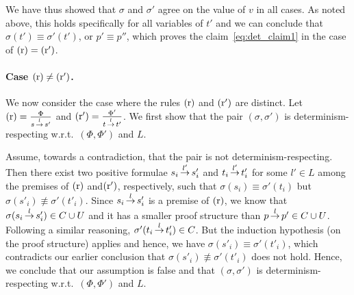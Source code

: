 We have thus showed that $\sigma$ and $\sigma'$ agree on the value of $v$ in all cases. 
As noted above, this holds specifically for all variables of $t'$
and we can conclude that $\sigma(t')\equiv\sigma'(t')$, or $p'\equiv p''$, 
which proves the claim~\eqref{eq:det_claim1} in the case of $\mathrm{(r)}=\mathrm{(r')}$.

\paragraph{Case $\mathrm{(r)}\ne\mathrm{(r')}$.}
We now consider the case where the rules $\mathrm{(r)}$ and $\mathrm{(r')}$ are distinct.
Let $\mathrm{(r)} = \frac{\Phi}{s\,{\stackrel{{l}}{\rightarrow}}\,s'}$ and $\mathrm{(r')}=\frac{\Phi'}{t\,{\stackrel{{l}}{\rightarrow}}\,t'}$.
We first show that the pair $(\sigma, \sigma')$ is 
determinism-respecting w.r.t.\ $(\Phi, \Phi')$ and $L$.

Assume, towards a contradiction, that the pair is not determinism-respecting.
Then there exist two positive formulae $s_i \,{\stackrel{{l'}}{\rightarrow}}\, s'_i$ and $t_i \,{\stackrel{{l'}}{\rightarrow}}\, t'_i$ 
for some $l' \in L$ among the premises of $\mathrm{(r)}$ and$\mathrm{(r')}$, respectively, such that
$\sigma(s_i) \equiv \sigma'(t_i)$ but $\sigma(s'_i) \nequiv \sigma'(t'_i)$.
Since $s_i \,{\stackrel{{l}}{\rightarrow}}\, s'_i$  is a premise of $\mathrm{(r)}$, we know that $\sigma(s_i \,{\stackrel{{l}}{\rightarrow}}\, s'_i) \in C \cup U$ 
and it has a smaller proof structure than $p \,{\stackrel{{l}}{\rightarrow}}\, p' \in C \cup U$. 
Following a similar reasoning, $\sigma'(t_i \,{\stackrel{{l}}{\rightarrow}}\, t'_i) \in C$.
But the induction hypothesis (on the proof structure) applies and hence, we have $\sigma(s'_i) \equiv \sigma'(t'_i)$, 
which contradicts our earlier conclusion that $\sigma(s'_i) \nequiv \sigma'(t'_i)$ does not hold. 
Hence, we conclude that our assumption is false and that $(\sigma, \sigma')$ is 
determinism-respecting w.r.t.\ $(\Phi, \Phi')$ and $L$.

